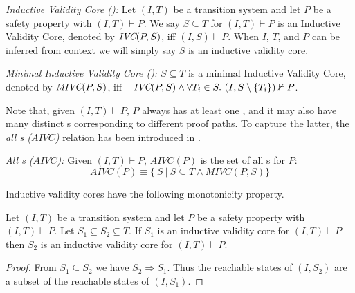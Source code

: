 \begin{definition}{\emph{Inductive Validity Core (\ivc):}}
  \label{def:ivc}
  Let $(I, T)$ be a transition system and let $P$ be a
  safety property with $(I, T)\vdash P$. 
  We say $S \subseteq T$ for $(I, T)\vdash P$ is an Inductive Validity Core,
  denoted by $\textit{IVC}(P, S)$, iff $(I, S) \vdash P $.
  When $I$, $T$, and $P$ can be inferred from
  context we will simply say $S$ is an inductive validity core.
\end{definition}

\begin{definition}{\emph{Minimal Inductive Validity Core (\mivc):}}
  \label{def:minimal-ivc}
  $S \subseteq T$ is a minimal Inductive Validity Core,
  denoted by $\textit{MIVC}(P, S)$, iff ~
  $\textit{IVC}(P, S) \wedge \forall T_i \in S.~ (I, S\setminus\{ T_i \}) \nvdash P$.
\end{definition}

Note that, given $(I, T) \vdash P$, $P$ always has at least one \mivc, and it may also have many distinct \mivc s corresponding to different proof paths. To capture the latter, the \emph{all \mivc s ($AIVC$)} relation has been introduced in \cite{Murugesan16:renext}.
\begin{definition}{\emph{All \mivc s ($AIVC$):}}
    \label{def:allivcs}
    Given $(I, T) \vdash P$, $AIVC(P)$ is the set of all \mivc s for $P$:
    $$ AIVC(P) \equiv  \{\ S~|~S \subseteq T \land  MIVC(P, S)\} $$
\end{definition}

Inductive validity cores have the following monotonicity property.

\begin{lemma}
  \label{lem:ivc-monotonic}
  Let $(I, T)$ be a transition system and let $P$ be a safety property
  with $(I, T)\vdash P$. Let $S_1 \subseteq S_2 \subseteq T$. If $S_1$
  is an inductive validity core for $(I, T)\vdash P$ then $S_2$ is an
  inductive validity core for $(I, T)\vdash P$.
\end{lemma}
\begin{proof}
  From $S_1 \subseteq S_2$ we have $S_2 \Rightarrow S_1$. Thus the
  reachable states of $(I, S_2)$ are a subset of the reachable states
  of $(I, S_1)$.
\end{proof}

